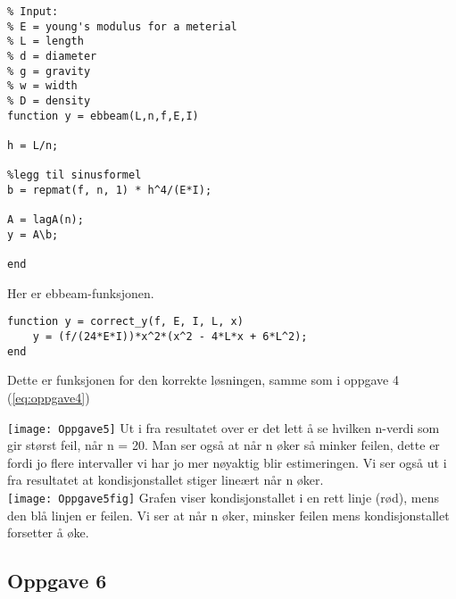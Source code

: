\begin{lstlisting}
% Input:
% E = young's modulus for a meterial
% L = length
% d = diameter
% g = gravity
% w = width
% D = density
function y = ebbeam(L,n,f,E,I)

h = L/n;

%legg til sinusformel
b = repmat(f, n, 1) * h^4/(E*I);

A = lagA(n);
y = A\b;

end
\end{lstlisting}
Her er ebbeam-funksjonen.

\begin{lstlisting}
function y = correct_y(f, E, I, L, x)
    y = (f/(24*E*I))*x^2*(x^2 - 4*L*x + 6*L^2);
end
\end{lstlisting}
Dette er funksjonen for den korrekte løsningen, samme som i oppgave 4 (\ref{eq:oppgave4})

\texttt{[image: Oppgave5]}
Ut i fra resultatet over er det lett å se hvilken n-verdi som gir størst feil, når n = 20. Man ser også at når n øker så minker feilen, dette er fordi jo flere intervaller vi har jo mer nøyaktig blir estimeringen. Vi ser også ut i fra resultatet at kondisjonstallet stiger lineært når n øker. \\
\texttt{[image: Oppgave5fig]}
Grafen viser kondisjonstallet i en rett linje (rød), mens den blå linjen er feilen. Vi ser at når n øker, minsker feilen mens kondisjonstallet forsetter å øke.

\subsection{Oppgave 6}
